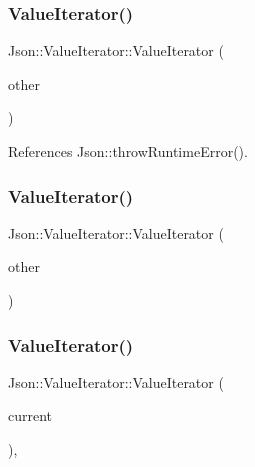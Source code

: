 \subsubsection{\texorpdfstring{Value\+Iterator()}{ValueIterator()}\hspace{0.1cm}{\footnotesize\ttfamily [2/4]}}
{\footnotesize\ttfamily Json\+::\+Value\+Iterator\+::\+Value\+Iterator (\begin{DoxyParamCaption}\item[{const \hyperlink{classJson_1_1ValueConstIterator}{Value\+Const\+Iterator} \&}]{other }\end{DoxyParamCaption})\hspace{0.3cm}{\ttfamily [explicit]}}



References Json\+::throw\+Runtime\+Error().

\mbox{\label{classJson_1_1ValueIterator_a7d5e58a9a4a553968acdf3064b39d21c_a7d5e58a9a4a553968acdf3064b39d21c}} 
\subsubsection{\texorpdfstring{Value\+Iterator()}{ValueIterator()}\hspace{0.1cm}{\footnotesize\ttfamily [3/4]}}
{\footnotesize\ttfamily Json\+::\+Value\+Iterator\+::\+Value\+Iterator (\begin{DoxyParamCaption}\item[{const \hyperlink{classJson_1_1ValueIterator}{Value\+Iterator} \&}]{other }\end{DoxyParamCaption})}

\mbox{\label{classJson_1_1ValueIterator_afb06ea21add440c78c27dc49570460a5_afb06ea21add440c78c27dc49570460a5}} 
\subsubsection{\texorpdfstring{Value\+Iterator()}{ValueIterator()}\hspace{0.1cm}{\footnotesize\ttfamily [4/4]}}
{\footnotesize\ttfamily Json\+::\+Value\+Iterator\+::\+Value\+Iterator (\begin{DoxyParamCaption}\item[{const Value\+::\+Object\+Values\+::iterator \&}]{current }\end{DoxyParamCaption})\hspace{0.3cm}{\ttfamily [explicit]}, {\ttfamily [private]}}

